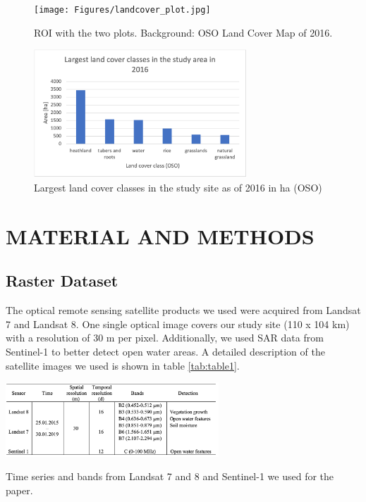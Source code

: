 \documentclass[a4paper, 10pt, conference]{ieeeconf}      %
\begin{document}
\begin{figure}[h]
\centering
\texttt{[image: Figures/landcover\_plot.jpg]}
\caption{ROI with the two plots. Background: OSO Land Cover Map of 2016.}
\label{fig:twoplots}
\end{figure}

\begin{figure}[h]
\centering
\includegraphics[width=8cm]{Figures/Study area stats.png}
\caption{Largest land cover classes in the study site as of 2016 in ha (OSO)}
\label{fig:landcover}
\end{figure}



\section{MATERIAL AND METHODS}



\subsection{Raster Dataset}

The optical remote sensing satellite products we used were acquired from Landsat 7 and Landsat 8. One single optical image covers our study site (110 x 104 km) with a resolution of 30 m per pixel. Additionally, we used SAR data from Sentinel-1 to better detect open water areas. A detailed description of the satellite images we used is shown in table \ref{tab:table1}.

\begin{table}[htbp]
\centering
\includegraphics[width=8cm]{Figures/Table_datasets.png}
\caption{Time series and bands from Landsat 7 and 8 and Sentinel-1 we used for the paper.}
\label{tab:table1}
\end{table}
\end{document}
